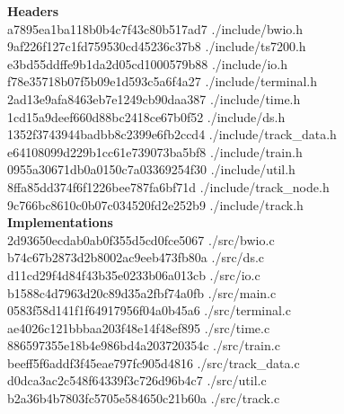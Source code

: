 \documentclass[11pt]{article}
\begin{document}
\noindent
\textbf{Headers}\\
a7895ea1ba118b0b4c7f43c80b517ad7  ./include/bwio.h\\
9af226f127c1fd759530cd45236c37b8  ./include/ts7200.h\\
e3bd55ddffe9b1da2d05cd1000579b88  ./include/io.h\\
f78e35718b07f5b09e1d593c5a6f4a27  ./include/terminal.h\\
2ad13e9afa8463eb7e1249cb90daa387  ./include/time.h\\
1cd15a9deef660d88bc2418ce67b0f52  ./include/ds.h\\
1352f3743944badbb8c2399e6fb2ccd4  ./include/track\_data.h\\
e64108099d229b1cc61e739073ba5bf8  ./include/train.h\\
0955a30671db0a0150c7a03369254f30  ./include/util.h\\
8ffa85dd374f6f1226bee787fa6bf71d  ./include/track\_node.h\\
9c766bc8610c0b07c034520fd2e252b9  ./include/track.h\\

\noindent
\textbf{Implementations}\\
2d93650ecdab0ab0f355d5cd0fce5067  ./src/bwio.c\\
b74c67b2873d2b8002ac9eeb473fb80a  ./src/ds.c\\
d11cd29f4d84f43b35e0233b06a013cb  ./src/io.c\\
b1588c4d7963d20c89d35a2fbf74a0fb  ./src/main.c\\
0583f58d141f1f64917956f04a0b45a6  ./src/terminal.c\\
ae4026c121bbbaa203f48e14f48ef895  ./src/time.c\\
886597355e18b4e986bd4a203720354c  ./src/train.c\\
beeff5f6addf3f45eae797fc905d4816  ./src/track\_data.c\\
d0dca3ac2c548f64339f3c726d96b4c7  ./src/util.c\\
b2a36b4b7803fc5705e584650c21b60a  ./src/track.c\\
\end{document}

